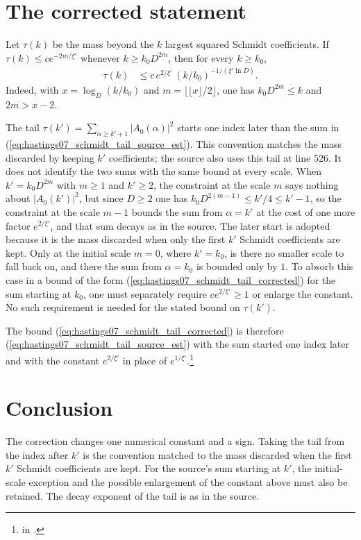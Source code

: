 \documentclass{article}
\begin{document}
\section{The corrected statement}

Let $\tau(k)$ be the mass beyond the $k$ largest squared Schmidt coefficients.
If $\tau(k)\le ce^{-2m/\xi'}$ whenever $k\ge k_0D^{2m}$, then for every
$k\ge k_0$,
\begin{align}
    \tau(k)
     & \le c\,e^{2/\xi'}\,(k/k_0)^{-1/(\xi'\ln D)}.
    \label{eq:hastings07_schmidt_tail_corrected}
\end{align}
Indeed, with $x=\log_D(k/k_0)$ and $m=\lfloor\lfloor x\rfloor/2\rfloor$, one
has $k_0D^{2m}\le k$ and $2m>x-2$.

The tail $\tau(k')=\sum_{\alpha\ge k'+1}|A_0(\alpha)|^2$ starts one index
later than the sum in (\ref{eq:hastings07_schmidt_tail_source_est}). This
convention matches the mass discarded by keeping $k'$ coefficients; the
source also uses this tail at line 526. It does not identify the two sums
with the same bound at every scale. When
$k'=k_0D^{2m}$ with $m\ge1$ and $k'\ge2$, the constraint at the scale $m$ says
nothing about $|A_0(k')|^2$, but since $D\ge2$ one has
$k_0D^{2(m-1)}\le k'/4\le k'-1$, so the constraint at the scale $m-1$ bounds
the sum from $\alpha=k'$ at the cost of one more factor $e^{2/\xi'}$, and that
sum decays as in the source. The later start is adopted because it is the mass
discarded when only the first $k'$ Schmidt coefficients are kept. Only at the initial
scale $m=0$, where $k'=k_0$, is there no smaller scale to fall back on, and
there the sum from $\alpha=k_0$ is bounded only by $1$. To absorb this case
in a bound of the form (\ref{eq:hastings07_schmidt_tail_corrected}) for the
sum starting at $k_0$, one must separately require $ce^{2/\xi'}\ge1$ or
enlarge the constant. No such requirement is needed for the stated bound
on $\tau(k')$.

The bound (\ref{eq:hastings07_schmidt_tail_corrected}) is therefore
(\ref{eq:hastings07_schmidt_tail_source_est}) with the sum started one index
later and with the constant $e^{2/\xi'}$ in place of
$e^{1/\xi'}$.\footnote{
    in .}

\section{Conclusion}

The correction changes one numerical constant and a sign. Taking the tail from
the index after $k'$ is the convention matched to the mass discarded when the
first $k'$ Schmidt coefficients are kept. For the source's sum starting at $k'$, the
initial-scale exception and the possible enlargement of the constant above
must also be retained. The decay exponent of the tail is as in the source.



\end{document}
